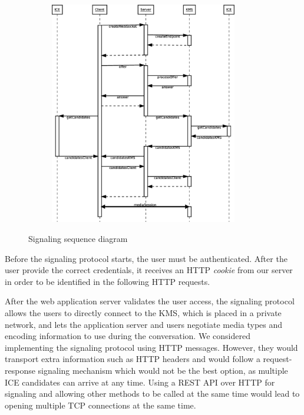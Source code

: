 \begin{figure}
    \centering
    \begin{subfigure}{}
    	\includegraphics[width=0.9\textwidth]{figures/signaling}
    \end{subfigure}
    \caption{Signaling sequence diagram}
    \label{fig:signaling2}
\end{figure} 


Before the signaling protocol starts, the user must be authenticated. After the user provide the correct credentials, it receives an \ac{HTTP} \emph{cookie} from our server in order to be identified in the following \ac{HTTP} requests.


After the web application server validates the user access, the signaling protocol allows the users to directly connect to the \ac{KMS}, which is placed in a private network, and lets the application server and users negotiate media types and encoding information to use during the conversation.
We considered implementing the signaling protocol using \ac{HTTP} messages.
However, they would transport extra information such as \ac{HTTP} headers and would follow a request-response signaling mechanism which would not be the best option, as multiple ICE candidates can arrive at any time. Using a \ac{REST} \ac{API} over \ac{HTTP} for signaling and allowing other methods to be called at the same time would lead to opening multiple \ac{TCP} connections at the same time.

